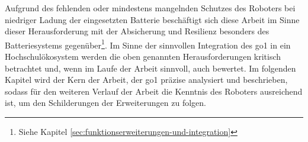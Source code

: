 Aufgrund des fehlenden oder mindestens mangelnden Schutzes des Roboters bei niedriger Ladung der eingesetzten Batterie
beschäftigt sich diese Arbeit im Sinne dieser Herausforderung mit der Absicherung und Resilienz besonders des Batteriesystems
gegenüber\footnote{Siehe Kapitel \ref{sec:funktionserweiterungen-und-integration}}.
Im Sinne der sinnvollen Integration des \gls{go1} in ein Hochschulökosystem werden die oben genannten Herausforderungen
kritisch betrachtet und, wenn im Laufe der Arbeit sinnvoll, auch bewertet.
Im folgenden Kapitel wird der Kern der Arbeit, der \gls{go1} präzise analysiert und beschrieben, sodass für den
weiteren Verlauf der Arbeit die Kenntnis des Roboters ausreichend ist, um den Schilderungen der Erweiterungen zu folgen.

